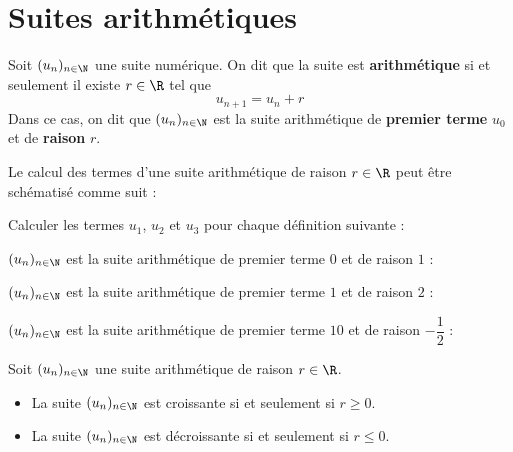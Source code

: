 \documentclass{article}
\begin{document}
\section{Suites arithmétiques}
\begin{tcolorbox}
\begin{definition}
Soit $(u_n)_{n \in \N}$ une suite numérique. On dit que la suite est \textbf{arithmétique} si et seulement il existe $r \in \R$ tel que
\begin{equation*}
u_{n+1} = u_n + r
\end{equation*}
Dans ce cas, on dit que $(u_n)_{n \in \N}$ est la suite arithmétique de \textbf{premier terme} $u_0$ et de \textbf{raison} $r$.
\end{definition}
\end{tcolorbox}
\begin{remark}
Le calcul des termes d'une suite arithmétique de raison $r \in \R$ peut être schématisé comme suit :
\begin{center}
\end{center}
\end{remark}
\begin{example}
Calculer les termes $u_1$, $u_2$ et $u_3$ pour chaque définition suivante :
\begin{enumquestions}
\item $(u_n)_{n \in \N}$ est la suite arithmétique de premier terme $0$ et de raison $1$ : \answersline
\item $(u_n)_{n \in \N}$ est la suite arithmétique de premier terme $1$ et de raison $2$ : \answersline
\item $(u_n)_{n \in \N}$ est la suite arithmétique de premier terme $10$ et de raison $-\dfrac{1}{2}$ : \answersline
\end{enumquestions}
\end{example}
\begin{proposition}
Soit $(u_n)_{n \in \N}$ une suite arithmétique de raison $r \in \R$.
\begin{itemize}
\item La suite $(u_n)_{n \in \N}$ est croissante si et seulement si $r \geq 0$. 
\item La suite $(u_n)_{n \in \N}$ est décroissante si et seulement si $r \leq 0$. 
\end{itemize}
\end{proposition}
\end{document}
